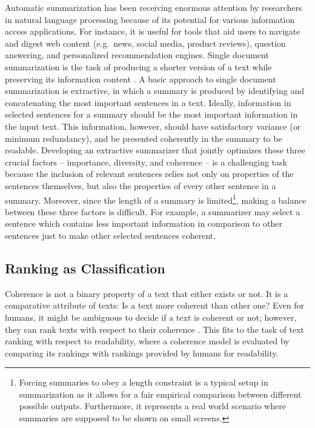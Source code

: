 Automatic summarization has been receiving enormous attention by researchers in natural language processing because of its potential for various information access applications. 
For instance, it is useful for tools that aid users to navigate and digest web content (e.g.\ news, social media, product reviews), question answering, and personalized recommendation engines. 
Single document summarization is the task of producing a shorter version of a text while preserving its information content \cite{nenkova11}. 
A basic approach to single document summarization is extractive, in which a summary is produced by identifying and concatenating the most important sentences in a text. 
Ideally, information in selected sentences for a summary should be the most important information in the input text. 
This information, however, should have satisfactory variance (or minimum redundancy), and be presented coherently in the summary to be readable. 
Developing an extractive summarizer that jointly optimizes these three crucial factors -- importance, diversity, and coherence -- is a challenging task because the inclusion of relevant sentences relies not only on properties of the sentences themselves, but also the properties of every other sentence in a summary. 
Moreover, since the length of a summary is limited\footnote{Forcing summaries to obey a length constraint is a typical setup in summarization as it allows for a fair empirical comparison between different possible outputs. 
 Furthermore, it represents a real world scenario where summaries are supposed to be shown on small screens. 
}, making a balance between these three factors is difficult. 
For example, a summarizer may select a sentence which contains less important information in comparison to other sentences just to make other selected sentences coherent. 

\subsection{Ranking as Classification} 

Coherence is not a binary property of a text that either exists or not. 
It is a comparative attribute of texts: Is a text more coherent than other one? 
Even for humans, it might be ambiguous to decide if a text is coherent or not; however, they can rank texts with respect to their coherence \cite{halliday76}. 
This fits to the task of text ranking with respect to readability, where a coherence model is evaluated by comparing its rankings with rankings provided by humans for readability. 

